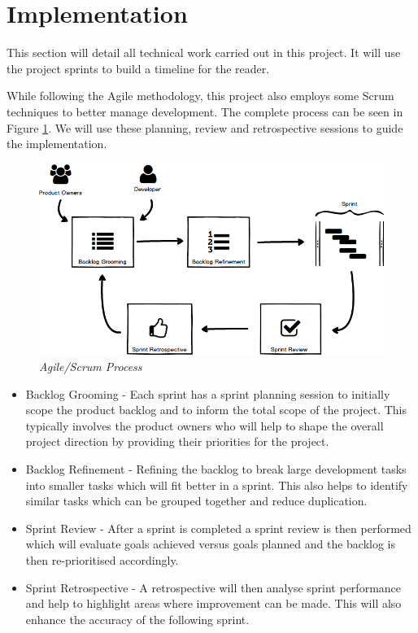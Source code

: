 \section{Implementation}
\label{sec:implementation}
This section will detail all technical work carried out in this project. It will use the project \glspl{sprint} to build a timeline for the reader. 

While following the Agile methodology, this project also employs some Scrum techniques to better manage development. The complete process can be seen in Figure \ref{fig:agile}. We will use these planning, review and retrospective sessions to guide the implementation.

\begin{figure}[!ht]
\centering
\includegraphics*[width=\textwidth]{images/scrum_process}
\caption{\em Agile/Scrum Process}
\label{fig:agile}
\end{figure}

\begin{itemize}
	\item Backlog Grooming - Each \gls{sprint} has a sprint planning session to initially scope the product backlog and to inform the total scope of the project. This typically involves the product owners who will help to shape the overall project direction by providing their priorities for the project.
	\item Backlog Refinement - Refining the backlog to break large development tasks into smaller tasks which will fit better in a sprint. This also helps to identify similar tasks which can be grouped together and reduce duplication.
	\item Sprint Review - After a sprint is completed a sprint review is then performed which will evaluate goals achieved versus goals planned and the backlog is then re-prioritised accordingly.
	\item Sprint Retrospective - A retrospective will then analyse sprint performance and help to highlight areas where improvement can be made. This will also enhance the accuracy of the following sprint.
\end{itemize}

